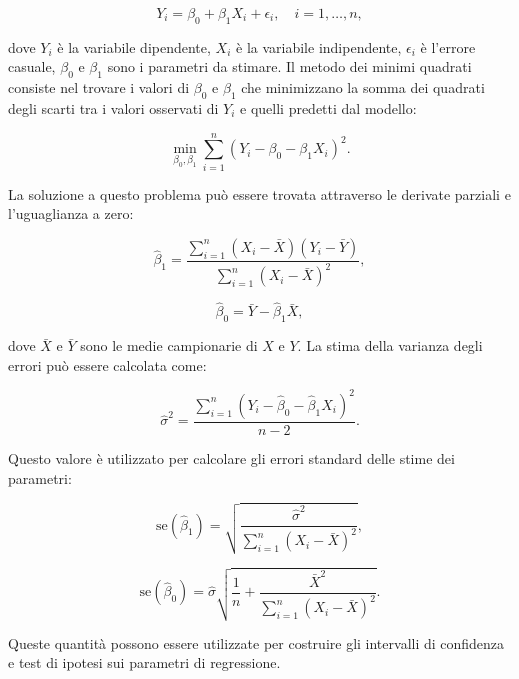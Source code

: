 $$Y_i = \beta_0 + \beta_1 X_i + \epsilon_i, \quad i = 1,\ldots,n,$$

dove $Y_i$ è la variabile dipendente, $X_i$ è la variabile indipendente, $\epsilon_i$ è l'errore casuale, $\beta_0$ e $\beta_1$ sono i parametri da stimare. Il metodo dei minimi quadrati consiste nel trovare i valori di $\beta_0$ e $\beta_1$ che minimizzano la somma dei quadrati degli scarti tra i valori osservati di $Y_i$ e quelli predetti dal modello:

$$\min_{\beta_0,\beta_1} \sum_{i=1}^n (Y_i - \beta_0 - \beta_1 X_i)^2.$$

La soluzione a questo problema può essere trovata attraverso le derivate parziali e l'uguaglianza a zero:

$$\hat{\beta}_1 = \frac{\sum_{i=1}^n (X_i - \bar{X})(Y_i - \bar{Y})}{\sum_{i=1}^n (X_i - \bar{X})^2},$$

$$\hat{\beta}_0 = \bar{Y} - \hat{\beta}_1 \bar{X},$$

dove $\bar{X}$ e $\bar{Y}$ sono le medie campionarie di $X$ e $Y$. La stima della varianza degli errori può essere calcolata come:

$$\hat{\sigma}^2 = \frac{\sum_{i=1}^n (Y_i - \hat{\beta}_0 - \hat{\beta}_1 X_i)^2}{n-2}.$$

Questo valore è utilizzato per calcolare gli errori standard delle stime dei parametri:

$$\text{se}(\hat{\beta}_1) = \sqrt{\frac{\hat{\sigma}^2}{\sum_{i=1}^n (X_i - \bar{X})^2}},$$

$$\text{se}(\hat{\beta}_0) = \hat{\sigma} \sqrt{\frac{1}{n} + \frac{\bar{X}^2}{\sum_{i=1}^n (X_i - \bar{X})^2}}.$$ 

Queste quantità possono essere utilizzate per costruire gli intervalli di confidenza e test di ipotesi sui parametri di regressione.

